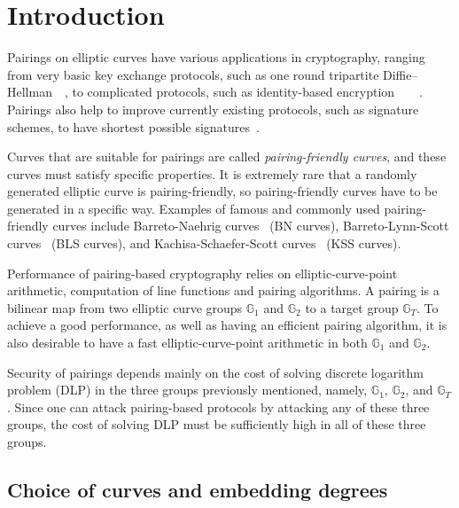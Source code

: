 \section{Introduction}
\label{sec:intro}

Pairings on elliptic curves have various applications in cryptography,
ranging from very basic key exchange protocols,
such as one round tripartite Diffie--Hellman~\cite{2000/joux-ants}~\cite{2004/joux-tripartite},
to complicated protocols, such as
identity-based encryption~\cite{2001/boneh}~\cite{2002/horwitz}~\cite{2002/gentry}~\cite{2005/sahai}.
Pairings also help to improve currently existing protocols, 
such as signature schemes, to have shortest possible signatures~\cite{2004/boneh}.

Curves that are suitable for pairings are called {\emph{pairing-friendly curves}},
and these curves must satisfy specific properties.
It is extremely rare that a randomly generated elliptic curve is pairing-friendly,
so pairing-friendly curves have to be generated in a specific way.
Examples of famous and commonly used pairing-friendly curves include 
Barreto-Naehrig curves~\cite{2006/barreto} (BN curves),
Barreto-Lynn-Scott curves~\cite{2003/bls} (BLS curves), and
Kachisa-Schaefer-Scott curves~\cite{2008/kss} (KSS curves).

Performance of pairing-based cryptography relies on
elliptic-curve-point arithmetic, computation of line functions and pairing algorithms.
A pairing is a bilinear map from two elliptic curve groups $\mathbb{G}_1$ and $\mathbb{G}_2$ to
a target group $\mathbb{G}_T$.
To achieve a good performance, as well as having an efficient pairing algorithm,
it is also desirable to have a fast elliptic-curve-point arithmetic in both $\mathbb{G}_1$ and $\mathbb{G}_2$.

Security of pairings depends mainly on the cost of solving discrete logarithm problem (DLP) in the three groups previously mentioned,
namely, $\mathbb{G}_1$, $\mathbb{G}_2$, and $\mathbb{G}_T$.
Since one can attack pairing-based protocols by attacking any of these three groups,
the cost of solving DLP must be sufficiently high in all of these three groups.


\subsection{Choice of curves and embedding degrees}


